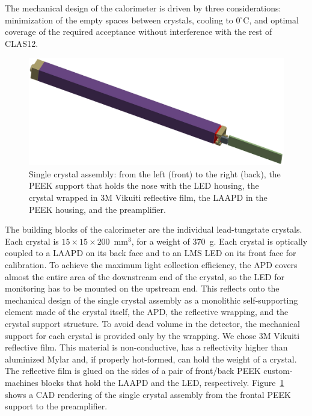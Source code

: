 The mechanical design of the calorimeter is driven by three considerations: minimization of the empty spaces between
crystals, cooling to $0^\circ$C, and optimal coverage of the required acceptance without interference with the rest
of CLAS12.

\begin{figure}[th!]
\centering 
\includegraphics[width=1.0\columnwidth]{./fig/sc-assembly.eps}
\caption{Single crystal assembly: from the left (front) to the right (back), the PEEK support that holds the nose with
  the LED housing, the crystal wrapped in 3M Vikuiti reflective film, the LAAPD in the PEEK housing, and the
  preamplifier.}
\label{fig:crystalassembly} 
\end{figure}

The building blocks of the calorimeter are the individual lead-tungstate crystals. Each crystal is
$15\times 15\times200$~mm$^3$, for a weight of 370~g. Each crystal is optically coupled to a LAAPD on its
back face and to an LMS LED on its front face for calibration. To achieve the maximum light collection efficiency,
the APD covers almost the entire area of the downstream end of the crystal, so the LED for monitoring has to be
mounted on the upstream end. This reflects onto the mechanical design of the single crystal assembly as a monolithic
self-supporting element made of the crystal itself, the APD, the reflective wrapping, and the crystal support
structure. To avoid dead volume in the detector, the mechanical support for each crystal is provided only by the
wrapping. We chose 3M Vikuiti reflective film. This material is non-conductive, has a reflectivity higher than
aluminized Mylar and, if properly hot-formed, can hold the weight of a crystal. The reflective film is glued on the
sides of a pair of front/back PEEK custom-machines blocks that hold the LAAPD and the LED, respectively.
Figure~\ref{fig:crystalassembly} shows a CAD rendering of the single crystal assembly from the frontal PEEK
support to the preamplifier.

